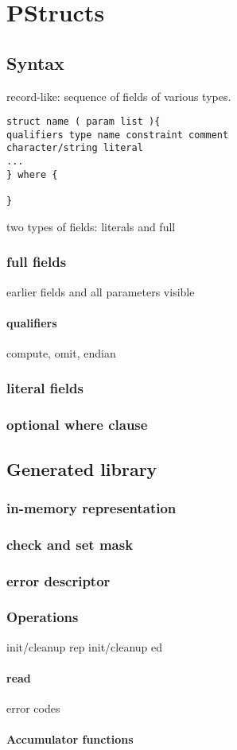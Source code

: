 \chapter{PStructs}
\label{chap:structs}
\section{Syntax}
record-like: sequence of fields of various types.
\begin{verbatim}
struct name ( param list ){
qualifiers type name constraint comment
character/string literal
...
} where {

}
\end{verbatim}
two types of fields: literals and full
\subsection{full fields}
earlier fields and all parameters visible 

\subsubsection{qualifiers}
 compute, omit, endian

\subsection{literal fields}

\subsection{optional where clause}

\section{Generated library}
\subsection{in-memory representation}
\subsection{check and set mask}
\subsection{error descriptor}
\subsection{Operations}
init/cleanup rep
init/cleanup ed
\subsubsection{read}
  error codes
\subsubsection{Accumulator functions}

